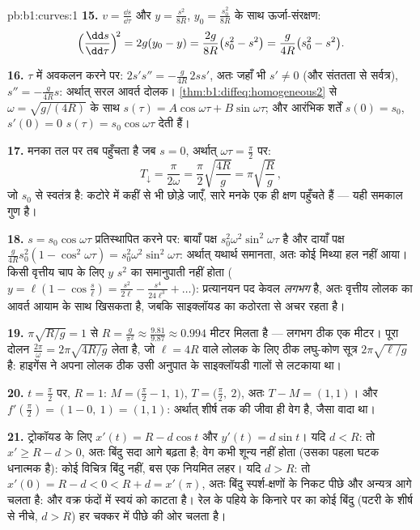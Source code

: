 \begin{solution}{pb:b1:curves:1}
\textbf{15.} $v = \frac{\dd s}{\dd\tau}$ और $y = \frac{s^2}{8R}$, $y_0 =
\frac{s_0^2}{8R}$ के साथ ऊर्जा-संरक्षण:
\[
\Bigl(\frac{\dd s}{\dd\tau}\Bigr)^{\!2} = 2g(y_0 - y)
= \frac{2g}{8R}\bigl(s_0^2 - s^2\bigr)
= \frac{g}{4R}\bigl(s_0^2 - s^2\bigr).
\]

\textbf{16.} $\tau$ में अवकलन करने पर: $2s's'' = -\frac{g}{4R}\,2ss'$, अतः
जहाँ भी $s' \neq 0$ (और संततता से सर्वत्र), $s'' = -\frac{g}{4R}s$: अर्थात्
सरल आवर्त दोलक। \cref{thm:b1:diffeq:homogeneous2} से $\omega =
\sqrt{g/(4R)}$ के साथ $s(\tau) = A\cos\omega\tau + B\sin\omega\tau$; और
आरंभिक शर्तें $s(0) = s_0$, $s'(0) = 0$ $s(\tau) = s_0\cos\omega\tau$ देती
हैं।

\textbf{17.} मनका तल पर तब पहुँचता है जब $s = 0$, अर्थात् $\omega\tau =
\frac\pi2$ पर:
\[
T_{\downarrow} = \frac{\pi}{2\omega}
= \frac\pi2\sqrt{\frac{4R}{g}} = \pi\sqrt{\frac Rg}\,,
\]
जो $s_0$ से स्वतंत्र है: कटोरे में कहीं से भी छोड़े जाएँ, सारे मनके एक ही
क्षण पहुँचते हैं --- यही समकाल गुण है।

\textbf{18.} $s = s_0\cos\omega\tau$ प्रतिस्थापित करने पर: बायाँ पक्ष
$s_0^2\omega^2\sin^2\omega\tau$ है और दायाँ पक्ष $\frac{g}{4R}s_0^2(1 -
\cos^2\omega\tau) = s_0^2\omega^2\sin^2\omega\tau$: अर्थात् यथार्थ समानता,
अतः कोई मिथ्या हल नहीं आया। किसी वृत्तीय चाप के लिए $y$ $s^2$ का समानुपाती
नहीं होता ($y = \ell(1 - \cos\frac s\ell) = \frac{s^2}{2\ell} -
\frac{s^4}{24\ell^3} + \dots$): प्रत्यानयन पद केवल \emph{लगभग}  है, अतः
वृत्तीय लोलक का आवर्त आयाम के साथ खिसकता है, जबकि साइक्लॉयड का कठोरता से अचर
रहता है।

\textbf{19.} $\pi\sqrt{R/g} = 1$ से $R = \frac{g}{\pi^2} \approx
\frac{9.81}{9.87} \approx 0.994$ मीटर मिलता है --- लगभग ठीक एक मीटर। पूरा
दोलन $\frac{2\pi}\omega = 2\pi\sqrt{4R/g}$ लेता है, जो  $\ell = 4R$
वाले लोलक के लिए ठीक लघु-कोण सूत्र $2\pi\sqrt{\ell/g}$ है: हाइगेंस ने अपना
लोलक ठीक उसी अनुपात के साइक्लॉयडी गालों से लटकाया था।

\textbf{20.} $t = \frac\pi2$ पर, $R = 1$: $M = \bigl(\frac\pi2 - 1,\
1\bigr)$, $T = \bigl(\frac\pi2,\ 2\bigr)$, अतः $T - M = (1, 1)$। और
$f'(\frac\pi2) = (1 - 0,\ 1) = (1, 1)$: अर्थात् शीर्ष तक की जीवा ही वेग है,
जैसा वादा था।

\textbf{21.} ट्रोकॉयड के लिए $x'(t) = R - d\cos t$ और $y'(t) = d\sin t$। यदि
$d < R$: तो $x' \geq R - d > 0$, अतः बिंदु सदा आगे बढ़ता है; वेग कभी शून्य
नहीं होता (उसका पहला घटक धनात्मक है): कोई विचित्र बिंदु नहीं, बस एक नियमित
लहर। यदि $d > R$: तो $x'(0) = R - d < 0 < R + d = x'(\pi)$, अतः बिंदु
स्पर्श-क्षणों के निकट पीछे और अन्यत्र आगे चलता है: और वक्र फंदों में स्वयं
को काटता है। रेल के पहिये के किनारे पर का कोई बिंदु (पटरी के शीर्ष से नीचे,
$d > R$) हर चक्कर में पीछे की ओर चलता है।


\end{solution}
